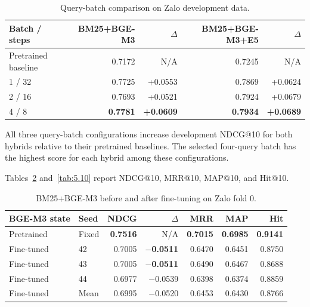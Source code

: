 \begin{table}[H]
\centering
\footnotesize
{}
\setlength{\tabcolsep}{6pt}
\renewcommand{\arraystretch}{1.05}
\caption{Query-batch comparison on Zalo development data.}\label{tab:5.8}
\vspace{6pt}
\begin{tabular}{@{}lrrrr@{}}
\toprule
\textbf{Batch / steps} & \textbf{BM25+\allowbreak{}BGE-M3} & \textbf{$\Delta$} & \textbf{BM25+\allowbreak{}BGE-M3+\allowbreak{}E5} & \textbf{$\Delta$} \\
\midrule
Pretrained baseline & 0.7172 & N/A & 0.7245 & N/A \\
1 / 32 & 0.7725 & +0.0553 & 0.7869 & +0.0624 \\
2 / 16 & 0.7693 & +0.0521 & 0.7924 & +0.0679 \\
4 / 8 & \textbf{0.7781} & \textbf{+0.0609} & \textbf{0.7934} & \textbf{+0.0689} \\
\bottomrule
\end{tabular}
\end{table}

All three query-batch configurations increase development NDCG@10 for both hybrids relative to their pretrained baselines. The selected four-query batch has the highest score for each hybrid among these configurations.

Tables~\ref{tab:5.9} and~\ref{tab:5.10} report NDCG@10, MRR@10, MAP@10, and Hit@10.

\begin{table}[H]
\centering
\footnotesize
{}
\setlength{\tabcolsep}{5pt}
\renewcommand{\arraystretch}{1.05}
\caption{BM25+BGE-M3 before and after fine-tuning on Zalo fold 0.}\label{tab:5.9}
\vspace{6pt}
\begin{tabular}{@{}llrrrrr@{}}
\toprule
\textbf{BGE-M3 state} & \textbf{Seed} & \textbf{NDCG} & \textbf{$\Delta$} & \textbf{MRR} & \textbf{MAP} & \textbf{Hit} \\
\midrule
Pretrained & Fixed & \textbf{0.7516} & N/A & \textbf{0.7015} & \textbf{0.6985} & \textbf{0.9141} \\
Fine-tuned & 42 & 0.7005 & \textbf{\ensuremath{-}0.0511} & 0.6470 & 0.6451 & 0.8750 \\
Fine-tuned & 43 & 0.7005 & \textbf{\ensuremath{-}0.0511} & 0.6490 & 0.6467 & 0.8688 \\
Fine-tuned & 44 & 0.6977 & \ensuremath{-}0.0539 & 0.6398 & 0.6374 & 0.8859 \\
Fine-tuned & Mean & 0.6995 & \ensuremath{-}0.0520 & 0.6453 & 0.6430 & 0.8766 \\
\bottomrule
\end{tabular}
\end{table}

